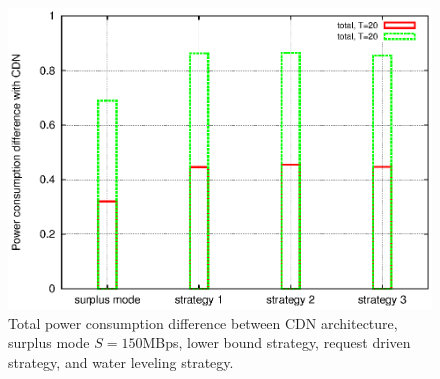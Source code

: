 \documentclass[conference]{IEEEtran}
\begin{document}
\begin{figure}[ht]
\begin{minipage}[b]{0.3\linewidth}
	\includegraphics[scale=0.4]{graphs/diff-cdn.eps}
	\caption{Total power consumption difference between CDN architecture, surplus mode $S=150$MBps, lower bound strategy, request driven strategy, and water leveling strategy.}
	\label{fig:difftocdn}
\end{minipage}
\label{fig:diffstrategy}
\end{figure}
\end{document}
